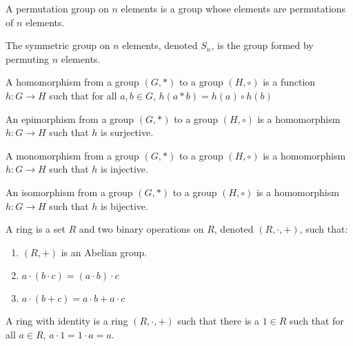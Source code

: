         \begin{definition}
            A permutation group on $n$ elements is a
            group whose elements are permutations of
            $n$ elements.
        \end{definition}
        \begin{definition}
            The symmetric group on $n$ elements,
            denoted $S_{n}$, is the group formed by
            permuting $n$ elements.
        \end{definition}
        \begin{definition}
            A homomorphism from a group $(G,*)$ to
            a group $(H,\circ)$ is a function
            $h:{G}\rightarrow{H}$ such that for all
            ${a,b}\in{G}$, $h(a*b)={h(a)}\circ{h(b)}$
        \end{definition}
        \begin{definition}
            An epimorphism from a group $(G,*)$ to
            a group $(H,\circ)$ is a homomorphism
            $h:{G}\rightarrow{H}$ such that
            $h$ is surjective.
        \end{definition}
        \begin{definition}
            A monomorphism from a group $(G,*)$ to
            a group $(H,\circ)$ is a homomorphism
            $h:{G}\rightarrow{H}$ such that
            $h$ is injective.
        \end{definition}
        \begin{definition}
            An isomorphism from a group $(G,*)$ to
            a group $(H,\circ)$ is a homomorphism
            $h:{G}\rightarrow{H}$ such that
            $h$ is bijective.
        \end{definition}
        \begin{definition}
            A ring is a set $R$ and two binary operations
            on $R$, denoted $(R,\cdot,+)$, such that:
            \begin{enumerate}
                \item $(R,+)$ is an Abelian group.
                \item $a\cdot({b}\cdot{c})=({a}\cdot{b})\cdot{c}$
                \item ${a}\cdot(b+c)={a}\cdot{b}+{a}\cdot{c}$
            \end{enumerate}
        \end{definition}
        \begin{definition}
            A ring with identity is a ring $(R,\cdot,+)$
            such that there is a ${1}\in{R}$ such that for
            all ${a}\in{R}$, ${a}\cdot{1}={1}\cdot{a}=a$.
        \end{definition}
